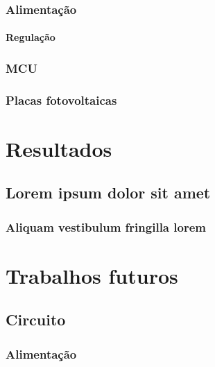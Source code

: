 \documentclass[
12pt,				%
openany,			%
twoside,			%
a4paper,			%
english,			%
french,				%
spanish,			%
brazil,				%
]{abntex2}
\begin{document}
\section{Alimentação}
\subsection{Regulação}
\section{MCU}
\section{Placas fotovoltaicas}

\part{Resultados}

\chapter{Lorem ipsum dolor sit amet}

\section{Aliquam vestibulum fringilla lorem}

\lipsum[1]

\lipsum[2-3]


\part{Trabalhos futuros}
\chapter{Circuito}

\section{Alimentação}
\end{document}

